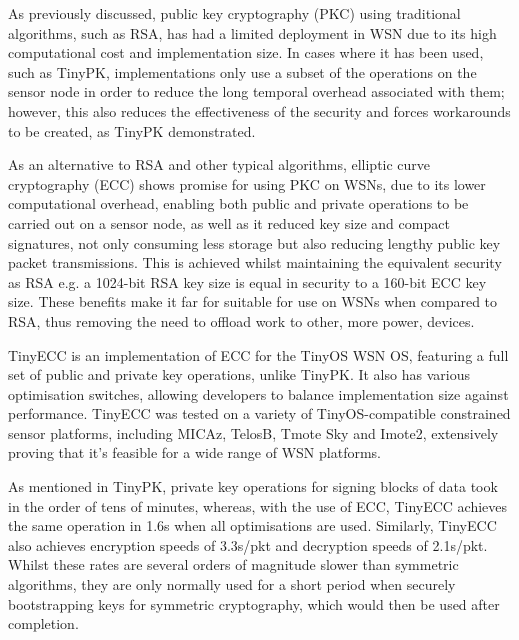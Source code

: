 As previously discussed, public key cryptography (PKC) using traditional algorithms, such as RSA, has had a limited deployment in WSN due to its high computational cost and implementation size. In cases where it has been used, such as TinyPK, implementations only use a subset of the operations on the sensor node in order to reduce the long temporal overhead associated with them; however, this also reduces the effectiveness of the security and forces workarounds to be created, as TinyPK demonstrated.

As an alternative to RSA and other typical algorithms, elliptic curve cryptography (ECC) shows promise for using PKC on WSNs, due to its lower computational overhead, enabling both public and private operations to be carried out on a sensor node, as well as it reduced key size and compact signatures, not only consuming less storage but also reducing lengthy public key packet transmissions. This is achieved whilst maintaining the equivalent security as RSA\cite{ECC} e.g. a 1024-bit RSA key size is equal in security to a 160-bit ECC key size. These benefits make it far for suitable for use on WSNs when compared to RSA, thus removing the need to offload work to other, more power, devices\cite{TinyPK}.

TinyECC \cite{TinyECC} is an implementation of ECC for the TinyOS WSN OS, featuring a full set of public and private key operations, unlike TinyPK. It also has various optimisation switches, allowing developers to balance implementation size against performance. TinyECC was tested on a variety of TinyOS-compatible constrained sensor platforms, including MICAz, TelosB, Tmote Sky and Imote2, extensively proving that it's feasible for a wide range of WSN platforms.

As mentioned in TinyPK, private key operations for signing blocks of data took in the order of tens of minutes\cite{TinyPK}, whereas, with the use of ECC, TinyECC achieves the same operation in 1.6s when all optimisations are used. Similarly, TinyECC also achieves encryption speeds of 3.3s/pkt and decryption speeds of 2.1s/pkt. Whilst these rates are several orders of magnitude slower than symmetric algorithms, they are only normally used for a short period when securely bootstrapping keys for symmetric cryptography, which would then be used after completion.